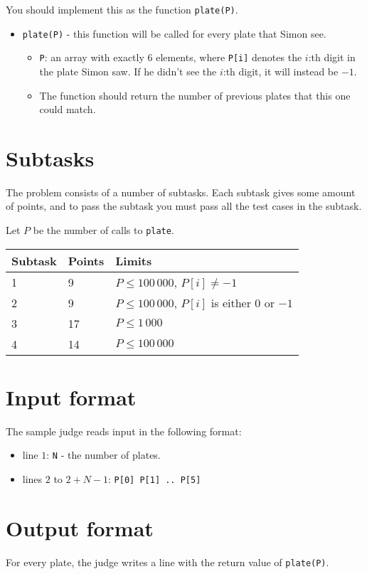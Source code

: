 You should implement this as the function \texttt{plate(P)}.
\begin{itemize}
  \item \texttt{plate(P)} - this function will be called for every plate that Simon see.
  \begin{itemize}
    \item \texttt{P}: an array with exactly 6 elements, where \texttt{P[i]} denotes the $i$:th digit in the plate Simon saw.
      If he didn't see the $i$:th digit, it will instead be $-1$.
    \item The function should return the number of previous plates that this one could match.
  \end{itemize}
\end{itemize}

\section*{Subtasks}
The problem consists of a number of subtasks. Each subtask gives some amount of points, and to pass
the subtask you must pass all the test cases in the subtask.

Let $P$ be the number of calls to \texttt{plate}.

\begin{tabular}{|l|l|l|}
  \hline
  \textbf{Subtask} & \textbf{Points} & \textbf{Limits} \\ \hline
  1 & 9 & $P \le 100\,000$, $P[i] \not= -1$ \\ \hline
  2 & 9 & $P \le 100\,000$, $P[i]$ is either $0$ or $-1$ \\ \hline
  3 & 17 & $P \le 1\,000$ \\ \hline
  4 & 14 & $P \le 100\,000$ \\ \hline
\end{tabular}

\section*{Input format}
The sample judge reads input in the following format:

\begin{itemize}
  \item line $1$: \texttt{N} - the number of plates.
  \item lines $2$ to $2 + N - 1$: \texttt{P[0] P[1] .. P[5]}
\end{itemize}

\section*{Output format}
For every plate, the judge writes a line with the return value of \texttt{plate(P)}.
